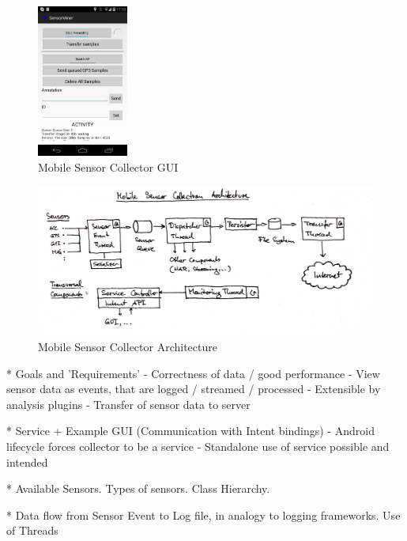 \documentclass[times, 10pt,twocolumn]{article}
\begin{document}

\begin{figure}[h]
\begin{center}
\includegraphics[width=3cm]{img/sc_gui.png}
\end{center}
\caption{Mobile Sensor Collector GUI}
\label{mobile}
\end{figure}


\begin{figure}[h]
\begin{center}
\includegraphics[width=\linewidth]{img/sc_architecture.jpg}
\end{center}
\caption{Mobile Sensor Collector Architecture}
\label{mobile}
\end{figure}

* Goals and 'Requirements'
  - Correctness of data / good performance
  - View sensor data as events, that are logged / streamed / processed
  - Extensible by analysis plugins
  - Transfer of sensor data to server

* Service + Example GUI (Communication with Intent bindings)
  - Android lifecycle forces collector to be a service
  - Standalone use of service possible and intended

* Available Sensors. Types of sensors. Class Hierarchy.

* Data flow from Sensor Event to Log file,
  in analogy to logging frameworks.
  Use of Threads
\end{document}
